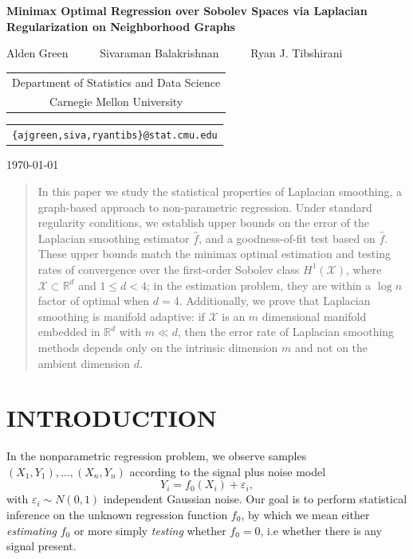 \documentclass[twoside]{article}
\newcommand{\Reals}{\mathbb{R}}
\newcommand{\1}{\mathbf{1}}
\newcommand{\Rd}{\Reals^d}
\newcommand{\Xset}{\mathcal{X}}
\newcommand{\wh}[1]{\widehat{#1}}
\theoremstyle{definition}
\theoremstyle{remark}
\begin{document}
\begin{center} {\Large{\bf{Minimax Optimal Regression over Sobolev Spaces via Laplacian Regularization on Neighborhood Graphs}}}
	
	\vspace*{.3cm}
	
	{\large{
			\begin{center}
				Alden Green~~~~~ Sivaraman Balakrishnan~~~~~ Ryan J. Tibshirani\\
				\vspace{.2cm}
			\end{center}
			
			
			\begin{tabular}{c}
				Department of Statistics and Data Science \\
				Carnegie Mellon University
			\end{tabular}
			
			\vspace*{.2in}
			
			\begin{tabular}{c}
				\texttt{\{ajgreen,siva,ryantibs\}@stat.cmu.edu}
			\end{tabular}
	}}
	
	\vspace*{.2in}
	
	\today
	\vspace*{.2in}

\end{center}


\begin{abstract}
	In this paper we study the statistical properties of Laplacian smoothing, a graph-based approach to non-parametric regression. Under standard regularity conditions, we establish upper bounds on the error of the Laplacian smoothing estimator $\wh{f}$, and a goodness-of-fit test based on $\wh{f}$. These upper bounds match the minimax optimal estimation and testing rates of convergence over the first-order Sobolev class $H^1(\Xset)$, where $\Xset \subset \Rd$ and $1 \leq d < 4$; in the estimation problem, they are within a $\log n$ factor of optimal when $d = 4$. Additionally, we prove that Laplacian smoothing is manifold adaptive: if $\Xset$ is an $m$ dimensional manifold embedded in $\Reals^d$ with $m \ll d$, then the error rate of Laplacian smoothing methods depends only on the intrinsic dimension $m$ and not on the ambient dimension $d$. 
\end{abstract}

\section{INTRODUCTION}
In the nonparametric regression problem, we observe samples $(X_1,Y_1),\ldots,(X_n,Y_n)$ according to the signal plus noise model
\begin{equation}
\label{eqn:signal_plus_noise_model}
Y_i = f_{0}(X_i) + \varepsilon_i,
\end{equation}
with $\varepsilon_i \sim N(0,1)$ independent Gaussian noise. Our goal is to perform statistical inference on the unknown regression function $f_0$, by which we mean either \emph{estimating} $f_0$ or more simply \emph{testing} whether $f_0 = 0$, i.e whether there is any signal present. 
\end{document}
